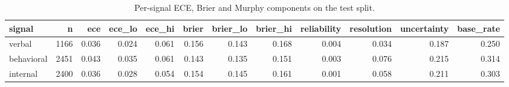 \begin{table}
\caption{Per-signal ECE, Brier and Murphy components on the test split.}
\label{tab:t6_h1_murphy_decomposition}
\begin{tabular}{lrrrrrrrrrrr}
\toprule
signal & n & ece & ece\_lo & ece\_hi & brier & brier\_lo & brier\_hi & reliability & resolution & uncertainty & base\_rate \\
\midrule
verbal & 1166 & 0.036 & 0.024 & 0.061 & 0.156 & 0.143 & 0.168 & 0.004 & 0.034 & 0.187 & 0.250 \\
behavioral & 2451 & 0.043 & 0.035 & 0.061 & 0.143 & 0.135 & 0.151 & 0.003 & 0.076 & 0.215 & 0.314 \\
internal & 2400 & 0.036 & 0.028 & 0.054 & 0.154 & 0.145 & 0.161 & 0.001 & 0.058 & 0.211 & 0.303 \\
\bottomrule
\end{tabular}
\end{table}

